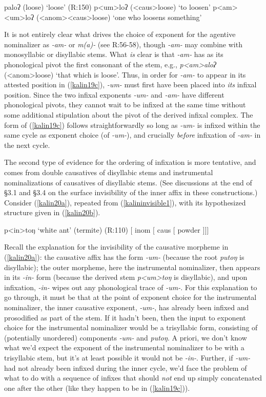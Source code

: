 \documentclass[output=paper,colorlinks,citecolor=brown,
]{langscibook}
\begin{document}
\ea
\ea paloʔ (loose) \hfill `loose' (R:150)
\ex p<um>loʔ ({\sc <caus>}loose) \hfill `to loosen'
\ex p<am><um>loʔ ({\sc <anom><caus>}loose) \hfill `one who loosens something'\label{kalin19c}
\z
\z

\noindent It is not entirely clear what drives the choice of exponent for the agentive nominalizer as \textit{-am-} or \textit{m(a)-} (see R:56-58), though \textit{-am-} may combine with monosyllabic or disyllabic stems. What {\it is} clear is that \textit{-am-} has as its phonological pivot the first consonant of the stem, e.g.,  \textit{p<am>aloʔ} ({\sc <anom>}loose) `that which is loose'. Thus, in order for \textit{-am-} to appear in its attested position in (\ref{kalin19c}), \textit{-um-} must first have been placed into {\it its} infixal position. Since the two infixal exponents \textit{-um-} and \textit{-am-} have different phonological pivots, they cannot wait to be infixed at the same time without some additional stipulation about the pivot of the derived infixal complex. The form of (\ref{kalin19c}) follows straightforwardly so long as \textit{-um-} is infixed within the same cycle as exponent choice (of \textit{-um-}), and crucially {\it before} infixation of \textit{-am-} in the next cycle.

The second type of evidence for the ordering of infixation  is more tentative, and comes from double causatives of disyllabic stems and instrumental nominalizations of causatives of disyllabic stems. (See discussions at the end of \S3.1 and \S3.4 on the surface invisibility of the inner affix in these constructions.) Consider (\ref{kalin20a}), repeated from (\ref{kalininvisible1}), with its hypothesized structure given in (\ref{kalin20b}).

\ea
\ea p<in>toŋ \hfill `white ant' (termite) (R:110)\label{kalin20a}
\ex $[$ {\sc  inom $[$ caus} $[$ powder $]$$]$$]$\label{kalin20b}
\z
\z

\noindent Recall the explanation for the invisibility of the causative morpheme in (\ref{kalin20a}): the causative affix has the form \textit{-um-} (because the root \textit{putoŋ} is disyllabic); the outer morpheme, here the instrumental nominalizer, then appears in its \textit{-in-} form (because the derived stem \textit{p<um>toŋ} is disyllabic), and upon infixation, \textit{-in-} wipes out any phonological trace of \textit{-um-}. For this explanation to go through, it must be that at the point of exponent choice for the instrumental nominalizer, the inner causative exponent, \textit{-um-}, has already been infixed and prosodified as part of the stem. If it hadn't been, then the input to exponent choice for the instrumental nominalizer would be a trisyllabic form, consisting of (potentially unordered) components \textit{-um-} and  \textit{putoŋ}. A priori, we don't know what we'd expect the exponent of the instrumental nominalizer to be with a trisyllabic stem, but it's at least possible it would not be \textit{-in-}. Further, if \textit{-um-} had not already been infixed during the inner cycle, we'd face the problem of what to do with a sequence of infixes that should \textit{not} end up simply concatenated one after the other (like they happen to be in (\ref{kalin19c})).
\end{document}
